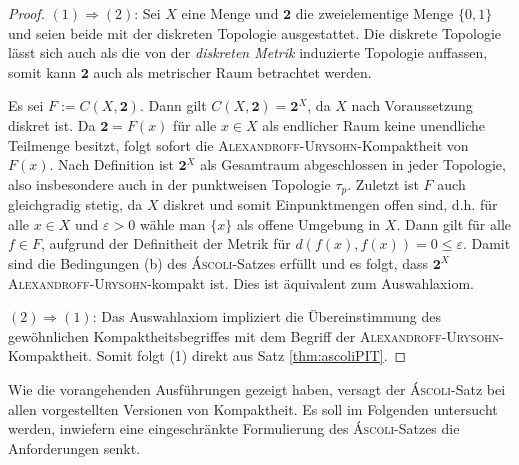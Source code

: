\begin{proof}
  $(1) \Rightarrow (2)$: Sei $X$ eine Menge und $\mathbf{2}$ die zweielementige Menge $\{0,1\}$ und seien beide mit der diskreten Topologie ausgestattet. 
  Die diskrete Topologie lässt sich auch als die von der \textit{diskreten Metrik} induzierte Topologie auffassen, somit kann $\mathbf{2}$ auch als metrischer Raum betrachtet werden. 

  Es sei $F := C(X, \mathbf{2})$.
  Dann gilt $C(X, \mathbf{2}) = \mathbf{2}^X$, da $X$ nach Voraussetzung diskret ist.
  Da $\mathbf{2} = F(x)$ für alle $x \in X$ als endlicher Raum keine unendliche Teilmenge besitzt, folgt sofort die \textsc{Alexandroff}-\textsc{Urysohn}-Kompaktheit von $F(x)$.
  Nach Definition ist $\mathbf{2}^X$ als Gesamtraum abgeschlossen in jeder Topologie, also insbesondere auch in der punktweisen Topologie $\tau_p$.
  Zuletzt ist $F$ auch gleichgradig stetig, da $X$ diskret und somit Einpunktmengen offen sind, d.h. für alle $x \in X$ und $\varepsilon > 0$ wähle man $\{x\}$ als offene Umgebung in $X$. Dann gilt für alle $f \in F$, aufgrund der Definitheit der Metrik für  $d(f(x),f(x)) = 0 \leq \varepsilon$.
  Damit sind die Bedingungen (b) des \textsc{Áscoli}-Satzes erfüllt und es folgt, dass $\mathbf{2}^X$ \textsc{Alexandroff}-\textsc{Urysohn}-kompakt ist. Dies ist äquivalent zum Auswahlaxiom.

  $(2)\Rightarrow(1)$: Das Auswahlaxiom impliziert die Übereinstimmung des gewöhnlichen Kompaktheitsbegriffes mit dem Begriff der \textsc{Alexandroff}-\textsc{Urysohn}-Kompaktheit. Somit folgt (1) direkt aus Satz \ref{thm:ascoliPIT}.
\end{proof}

Wie die vorangehenden Ausführungen gezeigt haben, versagt der \textsc{Áscoli}-Satz bei allen vorgestellten Versionen von Kompaktheit. Es soll im Folgenden untersucht werden, inwiefern eine eingeschränkte Formulierung des \textsc{Áscoli}-Satzes die Anforderungen senkt.

